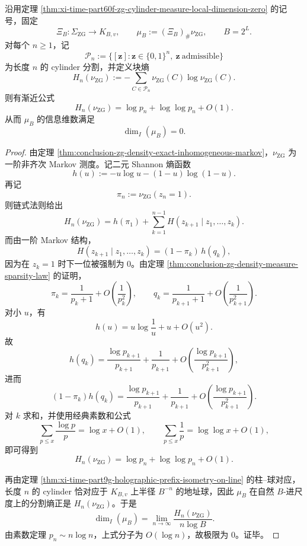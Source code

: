 \begin{theorem}[全息推前测度的块熵渐近与零信息维数]\label{thm:conclusion-zg-holographic-pushforward-entropy-information-dimension}
沿用定理 \ref{thm:xi-time-part60f-zg-cylinder-measure-local-dimension-zero} 的记号，固定
\[
\Xi_B:\Sigma_{\mathrm{ZG}}\to K_{B,v},
\qquad
\mu_B:=(\Xi_B)_\#\nu_{\mathrm{ZG}},
\qquad B=2^L.
\]
对每个 \(n\ge 1\)，记
\[
\mathcal P_n:=\{[\mathbf z]: \mathbf z\in\{0,1\}^n,\ \mathbf z\ \text{admissible}\}
\]
为长度 \(n\) 的 cylinder 分割，并定义块熵
\[
H_n(\nu_{\mathrm{ZG}})
:=
-\sum_{C\in\mathcal P_n}\nu_{\mathrm{ZG}}(C)\log \nu_{\mathrm{ZG}}(C).
\]
则有渐近公式
\[
H_n(\nu_{\mathrm{ZG}})=\log p_n+\log\log p_n+O(1).
\]
从而 \(\mu_B\) 的信息维数满足
\[
\dim_I(\mu_B)=0.
\]
\end{theorem}
\begin{proof}
由定理 \ref{thm:conclusion-zg-density-exact-inhomogeneous-markov}，\(\nu_{\mathrm{ZG}}\) 为一阶非齐次 Markov 测度。记二元 Shannon 熵函数
\[
h(u):=-u\log u-(1-u)\log(1-u).
\]
再记
\[
\pi_n:=\nu_{\mathrm{ZG}}(z_n=1).
\]
则链式法则给出
\[
H_n(\nu_{\mathrm{ZG}})
=
h(\pi_1)+\sum_{k=1}^{n-1}H(z_{k+1}\mid z_1,\dots,z_k).
\]
而由一阶 Markov 结构，
\[
H(z_{k+1}\mid z_1,\dots,z_k)
=
(1-\pi_k)\,h(q_k),
\]
因为在 \(z_k=1\) 时下一位被强制为 \(0\)。由定理 \ref{thm:conclusion-zg-density-measure-sparsity-law} 的证明，
\[
\pi_k=\frac{1}{p_k+1}+O\!\left(\frac1{p_k^2}\right),
\qquad
q_k=\frac{1}{p_{k+1}+1}+O\!\left(\frac1{p_{k+1}^2}\right).
\]
对小 \(u\)，有
\[
h(u)=u\log\frac1u+u+O(u^2).
\]
故
\[
h(q_k)
=
\frac{\log p_{k+1}}{p_{k+1}}
+\frac{1}{p_{k+1}}
+O\!\left(\frac{\log p_{k+1}}{p_{k+1}^2}\right),
\]
进而
\[
(1-\pi_k)h(q_k)
=
\frac{\log p_{k+1}}{p_{k+1}}
+\frac{1}{p_{k+1}}
+O\!\left(\frac{\log p_{k+1}}{p_{k+1}^2}\right).
\]
对 \(k\) 求和，并使用经典素数和公式
\[
\sum_{p\le x}\frac{\log p}{p}=\log x+O(1),
\qquad
\sum_{p\le x}\frac1p=\log\log x+O(1),
\]
即可得到
\[
H_n(\nu_{\mathrm{ZG}})
=
\log p_n+\log\log p_n+O(1).
\]

再由定理 \ref{thm:xi-time-part9g-holographic-prefix-isometry-on-line} 的柱--球对应，长度 \(n\) 的 cylinder 恰对应于 \(K_{B,v}\) 上半径 \(B^{-n}\) 的地址球，因此 \(\mu_B\) 在自然 \(B\)-进尺度上的分割熵正是 \(H_n(\nu_{\mathrm{ZG}})\)。于是
\[
\dim_I(\mu_B)
=
\lim_{n\to\infty}\frac{H_n(\nu_{\mathrm{ZG}})}{n\log B}.
\]
由素数定理 \(p_n\sim n\log n\)，上式分子为 \(O(\log n)\)，故极限为 \(0\)。证毕。
\end{proof}

